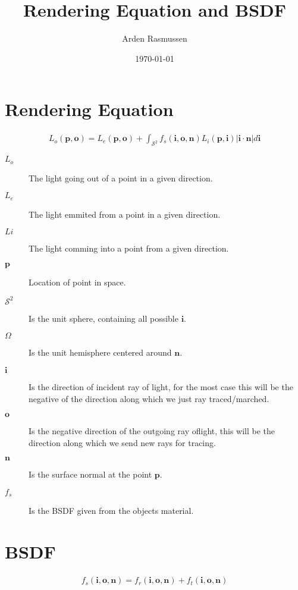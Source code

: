 \documentclass[10pt]{armath}
\title{Rendering Equation and BSDF}
\author{Arden Rasmussen}
\date{\today}
\newcommand{\lp}{\left(}
\newcommand{\rp}{\right)}
\newcommand{\lv}{\left|}
\newcommand{\rv}{\right|}
\renewcommand{\S}{\mathcal{S}}
\renewcommand{\b}[1]{\mathbf{#1}}
\begin{document}
\maketitle

\section{Rendering Equation}%
\label{sec:rendering_equation}

\begin{align*}
  L_o\lp\b{p},
  \b{o}\rp=L_e\lp\b{p},\b{o}\rp+\int_{\S^2}f_s\lp\b{i},\b{o},\b{n}\rp
  L_i\lp\b{p},\b{i}\rp\lv\b{i}\cdot\b{n}\rv d\b{i}
\end{align*}

\begin{description}
  \item[$L_o$] The light going out of a point in a given direction.
  \item[$L_e$] The light emmited from a point in a given direction.
  \item[$Li$] The light comming into a point from a given direction.
  \item[$\b{p}$] Location of point in space.
  \item[$\S^2$] Is the unit sphere, containing all possible $\b{i}$.
  \item[$\Omega$] Is the unit hemisphere centered around $\b{n}$.
  \item[$\b{i}$] Is the direction of incident ray of light, for the most case
    this will be the negative of the direction along which we just ray
    traced/marched.
  \item[$\b{o}$] Is the negative direction of the outgoing ray oflight, this will be the direction along which we send new rays for tracing.
  \item[$\b{n}$] Is the surface normal at the point $\b{p}$.
  \item[$f_s$] Is the BSDF given from the objects material.
\end{description}

\section{BSDF}%
\label{sec:bsdf}

\begin{align*}
  f_s\lp\b{i},\b{o},\b{n}\rp=f_r\lp\b{i},\b{o},\b{n}\rp+f_t\lp\b{i},\b{o},\b{n}\rp
\end{align*}
\end{document}
